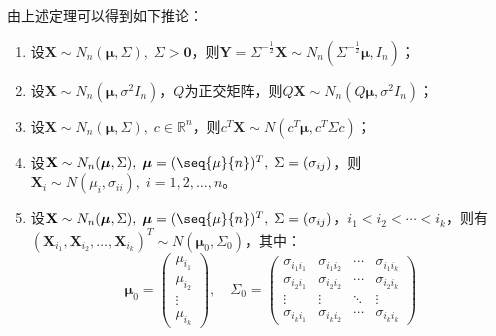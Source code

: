 \begin{corollary}\label{cor:MultiNormalLinearTransform}
	由上述定理可以得到如下推论：
	\begin{enumerate}
		\item 设$\mathbf{X}\sim N_n(\boldsymbol{\mu},\Sigma),\;\Sigma>\mathbf{0}$，则$\mathbf{Y}=\Sigma^{-\frac{1}{2}}\mathbf{X}\sim N_n(\Sigma^{-\frac{1}{2}}\boldsymbol{\mu},I_n)$；
		\item 设$\mathbf{X}\sim N_n(\boldsymbol{\mu},\sigma^2I_n)$，$Q$为正交矩阵，则$Q\mathbf{X}\sim N_n(Q\boldsymbol{\mu},\sigma^2I_n)$；
		\item 设$\mathbf{X}\sim N_n(\boldsymbol{\mu},\Sigma),\;c\in \mathbb{R}^{n}$，则$c^T\mathbf{X}\sim N(c^T\boldsymbol{\mu},c^T\Sigma c)$；
		\item 设$\mathbf{X}\sim N_n(\boldsymbol{\mu},\Sigma),\;\boldsymbol{\mu}=(\seq{\mu}{n})^T,\;\Sigma=(\sigma_{ij})$，则$\mathbf{X}_i\sim N(\mu_i,\sigma_{ii}),\;i=1,2,\dots,n$。
		\item 设$\mathbf{X}\sim N_n(\boldsymbol{\mu},\Sigma),\;\boldsymbol{\mu}=(\seq{\mu}{n})^T,\;\Sigma=(\sigma_{ij})$，$i_1<i_2<\cdots<i_k$，则有$(\mathbf{X}_{i_1},\mathbf{X}_{i_2},\dots,\mathbf{X}_{i_k})^T\sim N(\boldsymbol{\mu}_0,\Sigma_0)$，其中：
		\begin{equation*}
			\boldsymbol{\mu}_0=
			\begin{pmatrix}
				\mu_{i_1} \\
				\mu_{i_2} \\
				\vdots \\
				\mu_{i_k}
			\end{pmatrix}
			,\quad
			\Sigma_0=
			\begin{pmatrix}
				\sigma_{i_1i_1} & \sigma_{i_1i_2} & \cdots & \sigma_{i_1i_k} \\
				\sigma_{i_2i_1} & \sigma_{i_2i_2} & \cdots & \sigma_{i_2i_k} \\
				\vdots & \vdots & \ddots & \vdots \\
				\sigma_{i_ki_1} & \sigma_{i_ki_2} & \cdots & \sigma_{i_ki_k}
			\end{pmatrix}
		\end{equation*}
	\end{enumerate}
\end{corollary}
